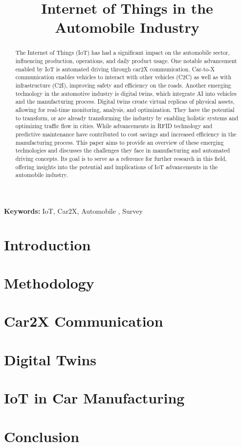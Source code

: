 \documentclass[conference]{IEEEtran}
\title{Internet of Things in the Automobile Industry}
\author{\IEEEauthorblockN{Henry Kniß}
\IEEEauthorblockA{Fachbereich 02, University of Applied Sciences\\
Frankfurt, Germany\\
Email: {kniss@stud.fra-uas.de}}}
\begin{document}
\maketitle

\begin{abstract}




The Internet of Things (IoT) has had a significant impact on the automobile sector, influencing production, operations, and daily product usage. One notable advancement enabled by IoT is automated driving through car2X communication. Car-to-X communication enables vehicles to interact with other vehicles (C2C) as well as with infrastructure (C2I), improving safety and efficiency on the roads. Another emerging technology in the automotive industry is digital twins, which integrate AI into vehicles and the manufacturing process. Digital twins create virtual replicas of physical assets, allowing for real-time monitoring, analysis, and optimization. They have the potential to transform, or are already transforming the industry by enabling holistic systems and optimizing traffic flow in cities. While advancements in RFID technology and predictive maintenance have contributed to cost savings and increased efficiency in the manufacturing process. This paper aims to provide an overview of these emerging technologies and discusses the challenges they face in manufacturing and automated driving concepts. Its goal is to serve as a reference for further research in this field, offering insights into the potential and implications of IoT advancements in the automobile industry.
\end{abstract}

\textbf{Keywords:} IoT, Car2X, Automobile , Survey

\section{Introduction}


\section{Methodology}


\section{Car2X Communication}


\section{Digital Twins}


\section{IoT in Car Manufacturing}


\section{Conclusion}



\end{document}
